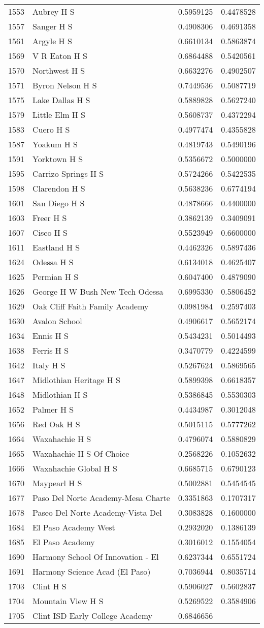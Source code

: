 \documentclass[
]{article}
\begin{document}
\begin{longtable}[]{@{}llrr@{}}
1553 & Aubrey H S & 0.5959125 & 0.4478528\tabularnewline
1557 & Sanger H S & 0.4908306 & 0.4691358\tabularnewline
1561 & Argyle H S & 0.6610134 & 0.5863874\tabularnewline
1569 & V R Eaton H S & 0.6864488 & 0.5420561\tabularnewline
1570 & Northwest H S & 0.6632276 & 0.4902507\tabularnewline
1571 & Byron Nelson H S & 0.7449536 & 0.5087719\tabularnewline
1575 & Lake Dallas H S & 0.5889828 & 0.5627240\tabularnewline
1579 & Little Elm H S & 0.5608737 & 0.4372294\tabularnewline
1583 & Cuero H S & 0.4977474 & 0.4355828\tabularnewline
1587 & Yoakum H S & 0.4819743 & 0.5490196\tabularnewline
1591 & Yorktown H S & 0.5356672 & 0.5000000\tabularnewline
1595 & Carrizo Springs H S & 0.5724266 & 0.5422535\tabularnewline
1598 & Clarendon H S & 0.5638236 & 0.6774194\tabularnewline
1601 & San Diego H S & 0.4878666 & 0.4400000\tabularnewline
1603 & Freer H S & 0.3862139 & 0.3409091\tabularnewline
1607 & Cisco H S & 0.5523949 & 0.6600000\tabularnewline
1611 & Eastland H S & 0.4462326 & 0.5897436\tabularnewline
1624 & Odessa H S & 0.6134018 & 0.4625407\tabularnewline
1625 & Permian H S & 0.6047400 & 0.4879090\tabularnewline
1626 & George H W Bush New Tech Odessa & 0.6995330 &
0.5806452\tabularnewline
1629 & Oak Cliff Faith Family Academy & 0.0981984 &
0.2597403\tabularnewline
1630 & Avalon School & 0.4906617 & 0.5652174\tabularnewline
1634 & Ennis H S & 0.5434231 & 0.5014493\tabularnewline
1638 & Ferris H S & 0.3470779 & 0.4224599\tabularnewline
1642 & Italy H S & 0.5267624 & 0.5869565\tabularnewline
1647 & Midlothian Heritage H S & 0.5899398 & 0.6618357\tabularnewline
1648 & Midlothian H S & 0.5386845 & 0.5530303\tabularnewline
1652 & Palmer H S & 0.4434987 & 0.3012048\tabularnewline
1656 & Red Oak H S & 0.5015115 & 0.5777262\tabularnewline
1664 & Waxahachie H S & 0.4796074 & 0.5880829\tabularnewline
1665 & Waxahachie H S Of Choice & 0.2568226 & 0.1052632\tabularnewline
1666 & Waxahachie Global H S & 0.6685715 & 0.6790123\tabularnewline
1670 & Maypearl H S & 0.5002881 & 0.5454545\tabularnewline
1677 & Paso Del Norte Academy-Mesa Charte & 0.3351863 &
0.1707317\tabularnewline
1678 & Paseo Del Norte Academy-Vista Del & 0.3083828 &
0.1600000\tabularnewline
1684 & El Paso Academy West & 0.2932020 & 0.1386139\tabularnewline
1685 & El Paso Academy & 0.3016012 & 0.1554054\tabularnewline
1690 & Harmony School Of Innovation - El & 0.6237344 &
0.6551724\tabularnewline
1691 & Harmony Science Acad (El Paso) & 0.7036944 &
0.8035714\tabularnewline
1703 & Clint H S & 0.5906027 & 0.5602837\tabularnewline
1704 & Mountain View H S & 0.5269522 & 0.3584906\tabularnewline
1705 & Clint ISD Early College Academy & 0.6846656 &

\end{longtable}
\end{document}
